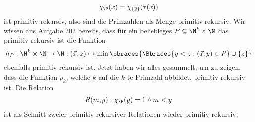 \begin{solution}
\begin{enumerate}[label = (\alph*)]
\begin{enumerate}
\begin{align*}
					\chi_\P(x) = \chi_{\{2\}}(\tau(x))
				\end{align*}
				ist primitiv rekursiv, also sind die Primzahlen als Menge primitiv rekursiv. \newline 
				Wir wissen aus Aufgabe 202 bereits, dass für ein beliebieges $P \subseteq \N^k \times \N$ das primitiv rekursiv ist die Funktion 
				\begin{align*}
				h_P: \N^k \times \N \to \N: (\vec{x}, z) \mapsto \min\pbraces{\Bbraces{y < z: (\vec{x}, y) \in P} \cup \{z\}}
				\end{align*}
				ebenfalls primitiv rekursiv ist.
%
%
				\newline
				Jetzt haben wir alles gesammelt, um zu zeigen, dass die Funktion
				$p_k$, welche $k$ auf die $k$-te Primzahl abbildet,
				primitiv rekursiv ist. Die Relation
				\begin{align*}
					R(m,y):  \chi_\P(y) = 1 \land m < y
				\end{align*}
				ist als Schnitt zweier primitiv rekursiver Relationen wieder primitiv rekursiv.

\end{enumerate}
\end{enumerate}
\end{solution}
